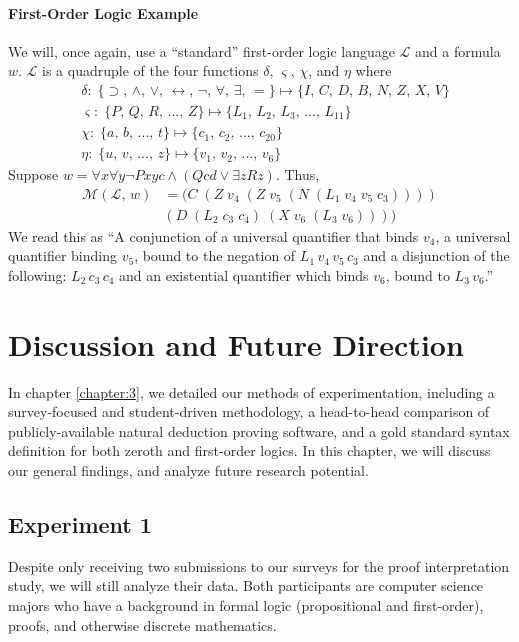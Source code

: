 \documentclass[ms]{uncgdissertationexp2}
\theoremstyle{plain}
\theoremstyle{definition}
\theoremstyle{remark}
\begin{document}
\subsubsection{First-Order Logic Example} We will, once again, use a ``standard'' first-order logic language $\mathcal{L}$ and a formula $w$. $\mathcal{L}$ is a quadruple of the four functions $\delta$, $\varsigma$, $\chi$, and $\eta$ where
\begin{align*}
	  & \delta:\;\{\supset,\,\land,\,\lor,\,\leftrightarrow,\,\lnot,\,\forall,\,\exists,\,=\}\mapsto \{I,\,C,\,D,\,B,\,N,\,Z,\,X,\,V\} \\
	  & \varsigma:\;\{P,\,Q,\,R,\,...,\,Z\} \mapsto \{L_{1},\,L_{2},\,L_{3},\,...,\,L_{11}\}                                                                       \\
	  & \chi:\;\{a,\,b,\,...,\,t\} \mapsto \{c_1,\,c_2,\,...,\,c_{20}\}                                                                                       \\
	  & \eta:\;\{u,\,v,\,...,\,z\} \mapsto \{v_1,\,v_2,\,...,\,v_6\}                                                                           
\end{align*}
Suppose $w = \forall{x}\forall{y}\lnot{Pxyc} \land (Qcd \lor \exists{z}Rz)$. Thus,
\begin{align*}
	\mathcal{M}(\mathcal{L},\,w) & = (C\;(Z\;v_4\;(Z\;v_5\;(N\;(L_1\;v_4\;v_5\;c_3)))) \\
	                   & (D\;(L_2\;c_3\;c_4)\;(X\;v_6\;(L_3\;v_6))))         
\end{align*}
We read this as ``A conjunction of a universal quantifier that binds $v_4$, a universal quantifier binding $v_5$, bound to the negation of $L_1\,v_4\,v_5\,c_3$ and a disjunction of the following: $L_2\,c_3\,c_4$ and an existential quantifier which binds $v_6$, bound to $L_3\,v_6$.''

\chapter{Discussion and Future Direction}\label{chapter:4}
In chapter \ref{chapter:3}, we detailed our methods of experimentation, including a survey-focused and student-driven methodology, a head-to-head comparison of publicly-available natural deduction proving software, and a gold standard syntax definition for both zeroth and first-order logics. In this chapter, we will discuss our general findings, and analyze future research potential.

\section{Experiment 1}
Despite only receiving two submissions to our surveys for the proof interpretation study, we will still analyze their data. Both participants are computer science majors who have a background in formal logic (propositional and first-order), proofs, and otherwise discrete mathematics.
\end{document}

